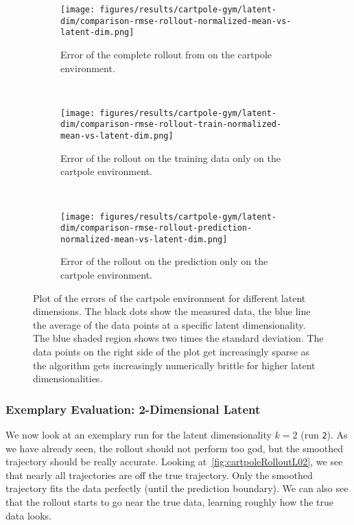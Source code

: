 			\begin{figure}
				\centering
				\begin{subfigure}{0.7\linewidth}
					\centering
					\texttt{[image: figures/results/cartpole-gym/latent-dim/comparison-rmse-rollout-normalized-mean-vs-latent-dim.png]}
					\caption[Error of the complete rollout on the cartpole environment]{Error of the complete rollout from on the cartpole environment.}
					\label{fig:cartpoleRmseComplete}
				\end{subfigure} \\
				\begin{subfigure}{0.5\linewidth}
					\centering
					\texttt{[image: figures/results/cartpole-gym/latent-dim/comparison-rmse-rollout-train-normalized-mean-vs-latent-dim.png]}
					\caption[Error of the training rollout on the cartpole environment]{Error of the rollout on the training data only on the cartpole environment.}
					\label{fig:cartpoleRmseTrain}
				\end{subfigure}%
				~
				\begin{subfigure}{0.5\linewidth}
					\centering
					\texttt{[image: figures/results/cartpole-gym/latent-dim/comparison-rmse-rollout-prediction-normalized-mean-vs-latent-dim.png]}
					\caption[Error of the prediction rollout on the cartpole environment]{Error of the rollout on the prediction only on the cartpole environment.}
					\label{fig:cartpoleRmsePred}
				\end{subfigure}
				\caption[Errors on the cartpole environment for different latent dimensions]{Plot of the errors of the cartpole environment for different latent dimensions. The black dots show the measured data, the blue line the average of the data points at a specific latent dimensionality. The blue shaded region shows two times the standard deviation. The data points on the right side of the plot get increasingly sparse as the algorithm gets increasingly numerically brittle for higher latent dimensionalities.}
				\label{fig:cartpoleRmse}
			\end{figure}

		\subsubsection{Exemplary Evaluation: 2-Dimensional Latent}
			We now look at an exemplary run for the latent dimensionality \( k = 2 \) (run \texttt{2}). As we have already seen, the rollout should not perform too god, but the smoothed trajectory should be really accurate. Looking at~\autoref{fig:cartpoleRolloutL02}, we see that nearly all trajectories are off the true trajectory. Only the smoothed trajectory fits the data perfectly (until the prediction boundary). We can also see that the rollout starts to go near the true data, learning roughly how the true data looks.

